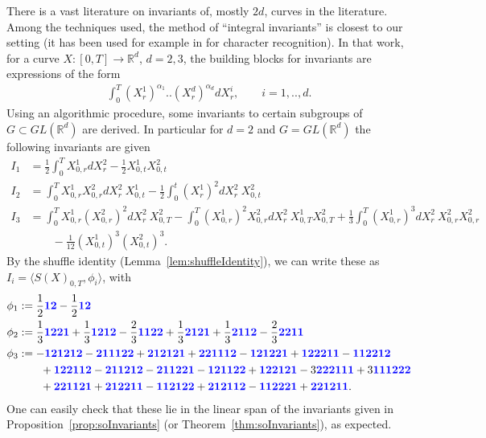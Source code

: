\documentclass{scrartcl}
\theoremstyle{plain}
\theoremstyle{definition}
\newcommand{\R}{\mathbb{R}}
\newcommand{\1}[1]{1_{\{#1\}}}
\newcommand{\ds}{d} %
\def\word#1{{\color{blue}\mathbf{#1}}}
\begin{document}
There is a vast literature on invariants of, mostly $2d$, curves in the literature.
Among the techniques used, the method of ``integral invariants'' 
\cite{bib:FKK2010} is closest to our setting
(it has been used for example in \cite{bib:GMW2009} for character recognition).
%
In that work, for a curve $X: [0,T] \to \R^\ds$, $\ds=2,3$,
the building blocks for invariants are expressions of the form
\begin{align}
  \label{eq:expression}
  \int_0^T (X^1_r)^{\alpha_1} .. (X^\ds_r)^{\alpha_\ds} dX^i_r, \qquad i=1,..,\ds.
\end{align}
%
Using an algorithmic procedure,
some invariants to certain subgroups of $G \subset GL(\R^\ds)$ are derived.
In particular for $\ds=2$ and $G=GL(\R^\ds)$ the following invariants are given
\begin{align*}
  I_1 &= \frac{1}{2} \int_0^T X^1_{0,r} dX^2_r - \frac{1}{2} X^1_{0,t} X^2_{0,t}  \\
  I_2 &= \int_0^T X^1_{0,r} X^2_{0,r} dX^2_r\ X^1_{0,t} - \frac{1}{2} \int_0^t (X^1_r)^2 dX^2_r\ X^2_{0,t} \\
  I_3 &= \int_0^T X^1_{0,r} (X^2_{0,r})^2 dX^2_r\ X^2_{0,T} - \int_0^T (X^1_{0,r})^2 X^2_{0,r} dX^2_r\ X^1_{0,T} X^2_{0,T}
          + \frac{1}{3} \int_0^T (X^1_{0,r})^3 dX^2_r\ X^2_{0,r} X^2_{0,r} \\
          &\qquad
          - \frac{1}{12} (X^1_{0,t})^3 (X^2_{0,t})^3.
\end{align*}
By the shuffle identity (Lemma~\ref{lem:shuffleIdentity}), we can write these as $I_i = \langle S(X)_{0,T}, \phi_i \rangle$, with
\begin{align*}
  \phi_1 &:= \frac{1}{2} \word{12} - \frac{1}{2} \word{12} \\
  \phi_2 &:= \frac13 \word{1221}
                            +\frac13 \word{1212}
                            -\frac23 \word{1122}
                            +\frac13 \word{2121}
                            +\frac13 \word{2112}
                            -\frac23 \word{2211} \\
  \phi_3 &:= - \word{121212} - \word{211122} + \word{212121} + \word{221112} - \word{121221} + \word{122211} - \word{112212}
  \\&\qquad + \word{122112}
    - \word{211212} - \word{211221} - \word{121122} + \word{122121} -3 \word{222111} +3 \word{111222} 
    \\&\qquad+ \word{221121} + \word{212211}
     - \word{112122}
    + \word{212112} - \word{112221} + \word{221211}.
\end{align*}
One can easily check that these lie in the linear span of the invariants given in Proposition~\ref{prop:soInvariants} (or Theorem~\ref{thm:soInvariants}),
as expected.
\end{document}
